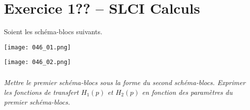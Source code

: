 \section*{Exercice 1?? -- SLCI Calculs}

\setcounter{exo}{0}


Soient les schéma-blocs suivants. 
\begin{center}
\texttt{[image: 046\_01.png]}
\end{center}



\begin{center}
\texttt{[image: 046\_02.png]}
\end{center}



\subparagraph{}\textit{Mettre le premier schéma-blocs sous la forme du second schéma-blocs. Exprimer les fonctions de transfert $H_1(p)$ et $H_2(p)$ en fonction des paramètres du premier schéma-blocs.}
\ifprof
\begin{corrige}
\end{corrige}
\else
\fi